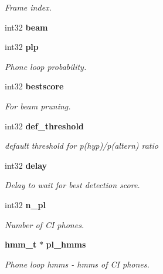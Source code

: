 \begin{DoxyCompactItemize}
\begin{DoxyCompactList}\small\item\em Frame index. \end{DoxyCompactList}\item 
int32 {\bfseries beam}\label{structkws__search__s_a5a84597099359059301dc6124579732e}

\item 
int32 {\bf plp}\label{structkws__search__s_a3bfc1d19e39d1cd321ce47280f1abe00}

\begin{DoxyCompactList}\small\item\em Phone loop probability. \end{DoxyCompactList}\item 
int32 {\bf bestscore}\label{structkws__search__s_a0a04bba471516468d1b2bea14632f255}

\begin{DoxyCompactList}\small\item\em For beam pruning. \end{DoxyCompactList}\item 
int32 {\bf def\-\_\-threshold}\label{structkws__search__s_afce4456a796dbc72149d7a47159ccca9}

\begin{DoxyCompactList}\small\item\em default threshold for p(hyp)/p(altern) ratio \end{DoxyCompactList}\item 
int32 {\bf delay}\label{structkws__search__s_acf2597fd017db4c2f90a9ba54e08a20c}

\begin{DoxyCompactList}\small\item\em Delay to wait for best detection score. \end{DoxyCompactList}\item 
int32 {\bf n\-\_\-pl}\label{structkws__search__s_aab6e42d0c93af992c16e2a75db386df4}

\begin{DoxyCompactList}\small\item\em Number of C\-I phones. \end{DoxyCompactList}\item 
{\bf hmm\-\_\-t} $\ast$ {\bf pl\-\_\-hmms}\label{structkws__search__s_a7b501f4cc5f4efb7b4ca0259afcf4e05}

\begin{DoxyCompactList}\small\item\em Phone loop hmms -\/ hmms of C\-I phones. \end{DoxyCompactList}\end{DoxyCompactItemize}


